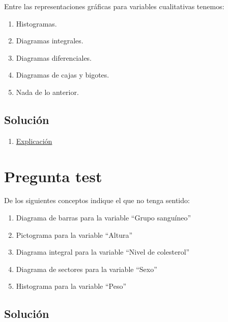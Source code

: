 \documentclass[
]{book}
\providecommand{\tightlist}{%
  \setlength{\itemsep}{0pt}\setlength{\parskip}{0pt}}
\begin{document}
Entre las representaciones gráficas para variables cualitativas tenemos:

\begin{enumerate}
\def\labelenumi{\alph{enumi})}
\tightlist
\item
  Histogramas.
\item
  Diagramas integrales.
\item
  Diagramas diferenciales.
\item
  Diagramas de cajas y bigotes.
\item
  Nada de lo anterior.
\end{enumerate}

\hypertarget{soluciuxf3n-21}{%
\subsection{Solución}\label{soluciuxf3n-21}}

\begin{enumerate}
\def\labelenumi{\alph{enumi})}
\setcounter{enumi}{3}
\tightlist
\item
  \href{https://1fjmanzano.github.io/bioestadistica/diagramas-de-barras-y-sectores.html}{Explicación}
\end{enumerate}

\hypertarget{pregunta-test-22}{%
\section{Pregunta test}\label{pregunta-test-22}}

De los siguientes conceptos indique el que no tenga sentido:

\begin{enumerate}
\def\labelenumi{\alph{enumi})}
\tightlist
\item
  Diagrama de barras para la variable ``Grupo sanguíneo''
\item
  Pictograma para la variable ``Altura''
\item
  Diagrama integral para la variable ``Nivel de colesterol''
\item
  Diagrama de sectores para la variable ``Sexo''
\item
  Histograma para la variable ``Peso''
\end{enumerate}

\hypertarget{soluciuxf3n-22}{%
\subsection{Solución}\label{soluciuxf3n-22}}
\end{document}
